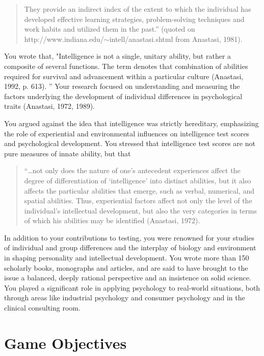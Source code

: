 \begin{refsection}
\begin{quote}
They provide an indirect index of the extent to which the individual has developed effective learning strategies, problem-solving techniques and work habits and utilized them in the past.” (quoted on http:\slash \slash www.indiana.edu\slash \ensuremath{\sim}intell\slash anastasi.shtml from Anastasi, 1981).
\end{quote}

You wrote that, "Intelligence is not a single, unitary ability, but rather a composite of several functions. The term denotes that combination of abilities required for survival and advancement within a particular culture (Anastasi, 1992, p. 613). ” Your research focused on understanding and measuring the factors underlying the development of individual differences in psychological traits (Anastasi, 1972, 1989). 

You argued against the idea that intelligence was strictly hereditary, emphasizing the role of experiential and environmental influences on intelligence test scores and psychological development. You stressed that intelligence test scores are not pure measures of innate ability, but that 

\begin{quote}

“{\ldots}not only does the nature of one's antecedent experiences affect the degree of differentiation of ‘intelligence’ into distinct abilities, but it also affects the particular abilities that emerge, such as verbal, numerical, and spatial abilities. Thus, experiential factors affect not only the level of the individual's intellectual development, but also the very categories in terms of which his abilities may be identified (Anastasi, 1972).
\end{quote}

In addition to your contributions to testing, you were renowned for your studies of individual and group differences and the interplay of biology and environment in shaping personality and intellectual development. You wrote more than 150 scholarly books, monographs and articles, and are said to have brought to the issue a balanced, deeply rational perspective and an insistence on solid science. You played a significant role in applying psychology to real-world situations, both through areas like industrial psychology and consumer psychology and in the clinical consulting room.

\section{Game Objectives}
\label{gameobjectives}


\end{refsection}
